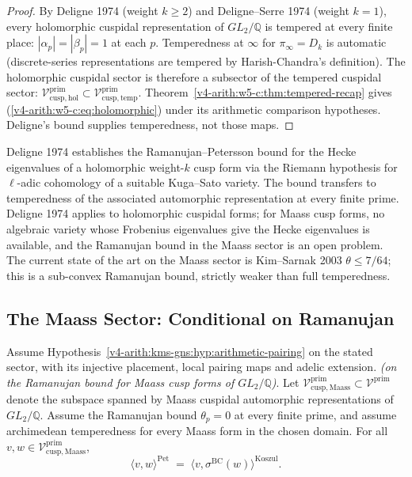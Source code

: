 \begin{proof}
By Deligne 1974 (weight \(k\geq 2\)) and Deligne--Serre 1974
(weight \(k=1\)), every holomorphic cuspidal representation of
\(GL_{2}/\mathbb{Q}\) is tempered at every finite place:
\(|\alpha_{p}|=|\beta_{p}|=1\) at each \(p\). Temperedness at \(\infty\)
for \(\pi_{\infty}=D_{k}\) is automatic (discrete-series
representations are tempered by Harish-Chandra's definition).
The holomorphic cuspidal sector is therefore a subsector of the
tempered cuspidal sector:
\(\mathcal{V}^{\mathrm{prim}}_{\mathrm{cusp,hol}}\subset\mathcal{V}^{\mathrm{prim}}_{\mathrm{cusp,temp}}\).
Theorem~\ref{v4-arith:w5-c:thm:tempered-recap} gives
(\ref{v4-arith:w5-c:eq:holomorphic}) under its arithmetic comparison
hypotheses. Deligne's bound supplies temperedness, not those maps.
\end{proof}

\begin{remark}
\label{v4-arith:w5-c:rem:deligne}
Deligne 1974 establishes the Ramanujan--Petersson bound for the
Hecke eigenvalues of a holomorphic weight-\(k\) cusp form via the
Riemann hypothesis for \(\ell\)-adic cohomology of a suitable
Kuga--Sato variety. The bound transfers to temperedness of the
associated automorphic representation at every finite prime.
Deligne 1974 applies to holomorphic cuspidal forms; for Maass cusp
forms, no algebraic variety whose Frobenius eigenvalues give the
Hecke eigenvalues is available, and the Ramanujan bound in the Maass
sector is an open problem.
The current state of the art on the Maass sector is Kim--Sarnak
2003 \(\theta\leq 7/64\); this is a sub-convex Ramanujan bound, strictly
weaker than full temperedness.
\end{remark}

\subsection{The Maass Sector: Conditional on Ramanujan}
\label{v4-arith:w5-c:non-tempered:maass}

\begin{theorem}
\label{v4-arith:w5-c:thm:maass-cuspidal}
Assume Hypothesis~\ref{v4-arith:kms-gns:hyp:arithmetic-pairing}
on the stated sector, with its injective placement, local pairing maps
and adelic extension.
\emph{(on the Ramanujan bound for Maass cusp
forms of \(GL_{2}/\mathbb{Q}\))}. Let
\(\mathcal{V}^{\mathrm{prim}}_{\mathrm{cusp,Maass}}\subset\mathcal{V}^{\mathrm{prim}}\)
denote the subspace spanned by Maass cuspidal automorphic
representations of \(GL_{2}/\mathbb{Q}\). Assume the Ramanujan bound
\(\theta_{p}=0\) at every finite prime, and assume archimedean
temperedness for every Maass form in the chosen domain. For
all \(v,w\in\mathcal{V}^{\mathrm{prim}}_{\mathrm{cusp,Maass}}\),
\begin{equation}
\label{v4-arith:w5-c:eq:maass}
\langle v,w\rangle^{\mathrm{Pet}}
\;=\;\langle v,\sigma^{\mathrm{BC}}(w)\rangle^{\mathrm{Koszul}}.
\end{equation}
\end{theorem}

